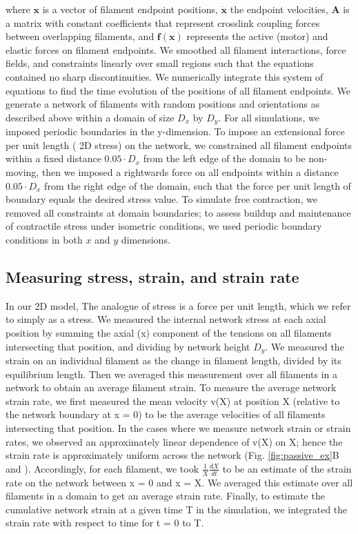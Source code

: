 \documentclass[10pt,letterpaper]{article}
\begin{document}
where $\mathbf{x}$ is a vector of filament endpoint positions, $\mathbf{\dot{x}}$ the endpoint velocities, $\mathbf{A }$ is a matrix with constant coefficients that represent crosslink coupling forces between overlapping filaments, and $\mathbf{f(x)}$ represents the active (motor) and elastic forces on filament endpoints. We smoothed all filament interactions, force fields, and constraints linearly over small regions such that the equations contained no sharp discontinuities. We numerically integrate this system of equations to find the time evolution of the positions of all filament endpoints. We generate a network of filaments with random positions and orientations as described above within a domain of size $D_x$ by $D_y$.  For all simulations, we imposed periodic boundaries in the y-dimension. To impose an extensional force per unit length ( 2D stress) on the network, we constrained all filament endpoints within a fixed distance $0.05\cdot D_x$ from the left edge of the domain to be non-moving, then we imposed a rightwards force on all endpoints within a distance $0.05\cdot D_x$ from the right edge of the domain, such that the force per unit length of boundary equals the desired stress value. To simulate free contraction, we removed all constraints at domain boundaries; to assess buildup and maintenance of contractile stress under isometric conditions, we used periodic boundary conditions in both $x$ and $y$ dimensions.

\subsection*{Measuring stress, strain, and strain rate}
In our 2D model, The analogue of stress is a force per unit length, which we refer to simply as a stress. We measured the internal network stress at each axial position by summing the axial (x) component of the tensions on all filaments intersecting that position, and dividing by network height $D_y$.  We measured the strain on an individual filament as the change in filament length, divided by its equilibrium length.  Then we averaged this measurement over all filaments in a network to obtain an average filament strain.  To measure the average network strain rate, we first measured the mean velocity v(X) at position X (relative to the network boundary at x = 0) to be the average velocities of all filaments intersecting that position.  In the cases where we measure network strain or strain rates, we observed an approximately linear dependence of v(X) on X; hence the strain rate is approximately uniform across the network (Fig. \ref{fig:passive_ex}B and ). Accordingly, for each filament, we took $\frac{1}{X} \frac{dX}{dt}$ to be an estimate of the strain rate on the network between x = 0 and x = X.  We averaged this estimate over all filaments in a domain to get an average strain rate.  Finally, to estimate the cumulative network strain at a given time T in the simulation, we integrated the strain rate with respect to time for t = 0 to T. 
\end{document}
